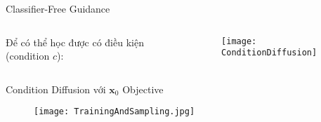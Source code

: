 

\begin{frame}{Classifier-Free Guidance}
	\begin{columns}
		\begin{column}{0.5\textwidth}
			Để có thể học được có điều kiện (condition $c$):
%			
			
		\end{column}
		
		\begin{column}{0.5\textwidth}
			\begin{figure}
				\centering
				\texttt{[image: ConditionDiffusion]}
			\end{figure}
		\end{column}
	\end{columns}
	

	
\end{frame}


\begin{frame}{Condition Diffusion với $\mathbf{x}_0$ Objective}
	\begin{figure}
		\centering
		\texttt{[image: TrainingAndSampling.jpg]}
	\end{figure}
\end{frame}




